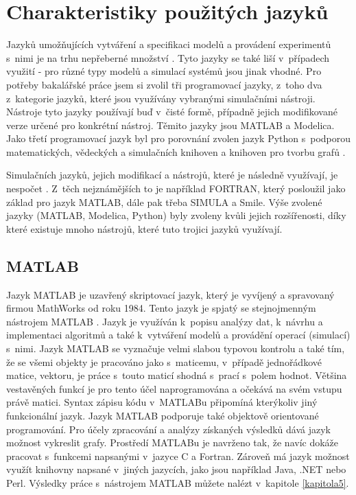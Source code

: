 \section{Charakteristiky použitých jazyků}
\label{popis-jazyky}
Jazyků umožňujících vytváření a specifikaci modelů a provádení experimentů s~nimi je na trhu nepřeberné množství \cite{list-of-process-modelling-lang}. Tyto jazyky se také liší v~případech využití - pro různé typy modelů a simulací systémů jsou jinak vhodné. Pro potřeby bakalářské práce jsem si zvolil tři programovací jazyky, z~toho dva z~kategorie jazyků, které jsou využívány vybranými simulačními nástroji. Nástroje tyto jazyky používají buď v~čisté formě, případně jejich modifikované verze určené pro konkrétní nástroj. Těmito jazyky jsou MATLAB\cite{MATLAB:2010} a Modelica\cite{Fritzson02modelica--}. Jako třetí programovací jazyk byl pro porovnání zvolen jazyk Python s~podporou matematických, vědeckých a simulačních knihoven a knihoven pro tvorbu grafů \cite{scipy}.

Simulačních jazyků, jejich modifikací a nástrojů, které je následně využívají, je nespočet \cite{list}. Z~těch nejznámějších to je například FORTRAN, který posloužil jako základ pro jazyk MATLAB, dále pak třeba SIMULA a Smile. Výše zvolené jazyky (MATLAB, Modelica, Python) byly zvoleny kvůli jejich rozšířenosti, díky které existuje mnoho nástrojů, které tuto trojici jazyků využívají.

\subsection*{MATLAB}
\label{matlab-lang}
Jazyk MATLAB je uzavřený skriptovací jazyk, který je vyvíjený a spravovaný firmou MathWorks od roku 1984. Tento jazyk je spjatý se stejnojmenným nástrojem MATLAB \cite{MATLAB:2010}. Jazyk je využíván k~popisu analýzy dat, k~návrhu a implementaci algoritmů a také k~vytváření modelů a provádění operací (simulací) s~nimi. Jazyk MATLAB se vyznačuje velmi slabou typovou kontrolu a také tím, že se všemi objekty je pracováno jako s~maticemu, v~případě jednořádkové matice, vektoru, je práce s~touto maticí shodná s~prací s~polem hodnot. Většina vestavěných funkcí je pro tento účel naprogramována a očekává na svém vstupu právě matici. Syntax zápisu kódu v~MATLABu připomíná kterýkoliv jiný funkcionální jazyk. Jazyk MATLAB podporuje také objektově orientované programování. Pro účely zpracování a analýzy získaných výsledků dává jazyk možnost vykreslit grafy. Prostředí MATLABu je navrženo tak, že navíc dokáže pracovat s~funkcemi napsanými v~jazyce C a Fortran. Zároveň má jazyk možnost využít knihovny napsané v~jiných jazycích, jako jsou například Java, .NET nebo Perl. Výsledky práce s~nástrojem MATLAB můžete nalézt v~kapitole \ref{kapitola5}.

